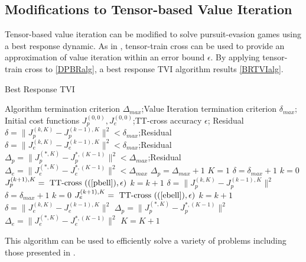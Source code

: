 \subsection{Modifications to Tensor-based Value Iteration}

Tensor-based value iteration can be modified to solve pursuit-evasion games using a best response dynamic. As in \cite{gorod}, tensor-train cross can be used to provide an approximation of value iteration within an error bound $\epsilon$. By applying tensor-train cross to \ref{DPBRalg}, a best response TVI algorithm results \ref{BRTVIalg}.
\begin{algorithm}
\caption{Best Response TVI }\label{BRTVIalg}
\begin{algorithmic}[1]
	\Require Algorithm termination criterion $\Delta_{max}$;Value Iteration termination criterion $\delta_{max}$; Initial cost functions $J_p^{(0,0)},J_e^{(0,0)}$;TT-cross accuracy $\epsilon$;
	\Ensure Residual $\delta=\|J_p^{(k,K)}-J_p^{(k-1),K}\|^2<\delta_{max}$;Residual $\delta=\|J_e^{(k,K)}-J_e^{(k-1),K}\|^2<\delta_{max}$;Residual $\Delta_p=\|J_p^{(*,K)}-J_p^{*,(K-1)}\|^2<\Delta_{max}$;Residual $\Delta_e=\|J_e^{(*,K)}-J_e^{*,(K-1)}\|^2<\Delta_{max}$
	\State $\Delta_p = \Delta_{max} + 1$
	\State $K = 1$
	 \do{}
		\State $\delta = \delta_{max} + 1$
		\State $k = 0$
		 \do{}
			\State $J_p^{(k+1),K} = \textnormal{ TT-cross }((\ref{pbell}),\epsilon)$
			\State $k = k+1$
			\State $\delta = \|J_p^{(k,K)}-J_p^{(k-1),K}\|^2$
		\EndWhile
		\State $\delta = \delta_{max} + 1$
		\State $k = 0$
		 \do{}
			\State $J_e^{(k+1),K} = \textnormal{ TT-cross }((\ref{ebell}),\epsilon)$
			\State $k = k+1$
			\State $\delta = \|J_e^{(k,K)}-J_e^{(k-1),K}\|^2$
		\EndWhile
		\State $\Delta_p = \|J_p^{(*,K)}-J_p^{*,(K-1)}\|^2$
		\State $\Delta_e = \|J_e^{(*,K)}-J_e^{*,(K-1)}\|^2$
		\State $K = K+1$
	\EndWhile
\end{algorithmic}
\end{algorithm}
This algorithm can be used to efficiently solve a variety of problems including those presented in . 